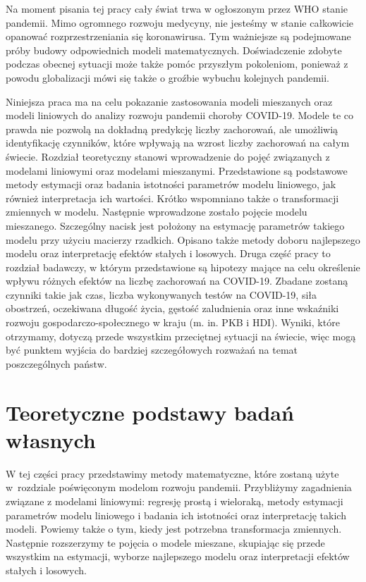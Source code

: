 \documentclass[12pt]{mwbk}
\theoremstyle{plain}
\theoremstyle{definition}
\theoremstyle{definition}
\begin{document}
Na moment pisania tej pracy cały świat trwa w ogłoszonym przez WHO stanie pandemii. Mimo ogromnego rozwoju medycyny, nie jesteśmy w stanie całkowicie opanować rozprzestrzeniania się koronawirusa. Tym ważniejsze są podejmowane próby budowy odpowiednich modeli matematycznych. Doświadczenie zdobyte podczas obecnej sytuacji może także pomóc przyszłym pokoleniom, ponieważ z powodu globalizacji mówi się także o groźbie wybuchu kolejnych pandemii.

Niniejsza praca ma na celu pokazanie zastosowania modeli mieszanych oraz modeli liniowych do analizy rozwoju pandemii choroby COVID-19. Modele te co prawda nie pozwolą na dokładną predykcję liczby zachorowań, ale umożliwią identyfikację czynników, które wpływają na wzrost liczby zachorowań na całym świecie. 
Rozdział teoretyczny stanowi wprowadzenie do pojęć związanych z modelami liniowymi oraz modelami mieszanymi. Przedstawione są podstawowe metody estymacji oraz badania istotności parametrów modelu liniowego, jak również interpretacja ich wartości. Krótko wspomniano także o transformacji zmiennych w modelu. Następnie wprowadzone zostało pojęcie modelu mieszanego. Szczególny nacisk jest położony na estymację parametrów takiego modelu przy użyciu macierzy rzadkich. Opisano także metody doboru najlepszego modelu oraz interpretację efektów stałych i losowych.
Druga część pracy to rozdział badawczy, w którym przedstawione są hipotezy mające na celu określenie wpływu różnych efektów na liczbę zachorowań na COVID-19.
Zbadane zostaną czynniki takie jak czas, liczba wykonywanych testów na COVID-19, siła obostrzeń, oczekiwana długość życia, gęstość zaludnienia oraz inne wskaźniki rozwoju gospodarczo-społecznego w kraju (m. in. PKB i HDI). Wyniki, które otrzymamy, dotyczą przede wszystkim przeciętnej sytuacji na świecie, więc mogą być punktem wyjścia do bardziej szczegółowych rozważań na temat poszczególnych państw.


 









\chapter{Teoretyczne podstawy badań własnych}
W tej części pracy przedstawimy metody matematyczne, które zostaną użyte w~rozdziale poświęconym modelom rozwoju pandemii. Przybliżymy zagadnienia związane z modelami liniowymi: regresję prostą i wieloraką, metody estymacji parametrów modelu liniowego i badania ich istotności oraz interpretację takich modeli. Powiemy także o tym, kiedy jest potrzebna transformacja zmiennych. Następnie rozszerzymy te pojęcia o modele mieszane, skupiając się przede wszystkim na estymacji, wyborze najlepszego modelu oraz interpretacji efektów stałych i losowych.
\end{document}
